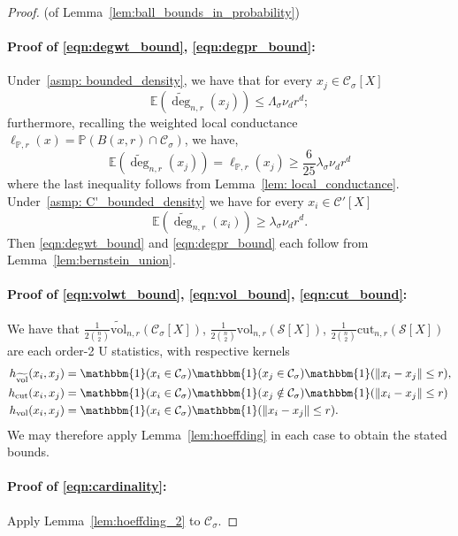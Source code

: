 \documentclass[11pt,twoside]{article}
\theoremstyle{definition}
\newcommand{\vol}{\mathrm{vol}}
\newcommand{\cut}{\mathrm{cut}}
\newcommand{\norm}[1]{\left\lVert#1\right\rVert}
\newcommand{\1}{\mathbbm{1}}
\newcommand{\Xbf}{X}
\newcommand{\Pbb}{\mathbb{P}}
\newcommand{\Sset}{\mathcal{S}}
\newcommand{\Cset}{\mathcal{C}}
\newcommand{\Csig}{\Cset_{\sigma}}
\begin{document}
\begin{proof}{(of Lemma~\ref{lem:ball_bounds_in_probability})}
	\item[]
	\paragraph{Proof of \eqref{eqn:degwt_bound}, \eqref{eqn:degpr_bound}:}
	Under~\ref{asmp: bounded_density}, we have that for every $x_j \in \Csig[\Xbf]$
	\begin{equation*}
	\mathbb{E}(\widetilde{\deg}_{n,r}(x_j)) \leq \Lambda_{\sigma} \nu_d r^d;
	\end{equation*}
	furthermore, recalling the weighted local conductance $\ell_{\Pbb,r}(x) = \Pbb(B(x,r) \cap \Csig)$, we have,
	\begin{equation*}
	\mathbb{E}(\widetilde{\deg}_{n,r}(x_j)) = \ell_{\Pbb,r}(x_j) \geq \frac{6}{25} \lambda_{\sigma} \nu_d r^d
	\end{equation*}
	where the last inequality follows from Lemma~\ref{lem: local_conductance}.  Under~\ref{asmp: C'_bounded_density} we have for every $x_i \in \Cset'[\Xbf]$
	\begin{equation*}
	\mathbb{E}(\widetilde{\deg}_{n,r}(x_i)) \geq \lambda_{
		\sigma} \nu_d r^d.
	\end{equation*} 
	Then \eqref{eqn:degwt_bound} and \eqref{eqn:degpr_bound} each follow from Lemma~\ref{lem:bernstein_union}.
	
	\paragraph{Proof of \eqref{eqn:volwt_bound}, \eqref{eqn:vol_bound}, \eqref{eqn:cut_bound}:}
	
	We have that $\frac{1}{2{n \choose 2}}\widetilde{\vol}_{n,r}(\Csig[\Xbf])$, $\frac{1}{2{n \choose 2}}\vol_{n,r}(\Sset[\Xbf])$, $\frac{1}{2{n \choose 2}}\cut_{n,r}(\Sset[\Xbf])$ are each order-2 U statistics, with respective kernels
	\begin{align*}
	h_{\widetilde{\vol}}(x_i,x_j) & = \1(x_i \in \Csig)\1(x_j \in \Csig)\1(\norm{x_i - x_j} \leq r), \\ h_{\cut}(x_i,x_j) & = \1(x_i \in \Csig)\1(x_j \notin \Csig)\1(\norm{x_i - x_j} \leq r) \\
	h_{\vol}(x_i,x_j) & = \1(x_i \in \Csig)\1(\norm{x_i - x_j} \leq r).
	\end{align*}
	We may therefore apply Lemma~\ref{lem:hoeffding} in each case to obtain the stated bounds.
	
	\paragraph{Proof of \eqref{eqn:cardinality}:}
	Apply Lemma~\ref{lem:hoeffding_2} to $\Csig$.
\end{proof}
\end{document}
